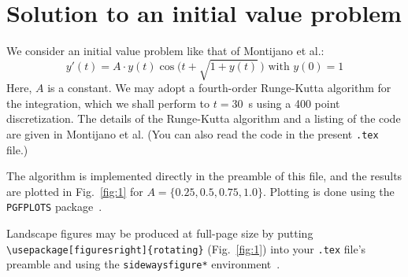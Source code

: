 \documentclass[nofontspec,grid,colorlinks,nofoot]{asmeconf}
\newcommand\addLUADEDplot[4][]{%
     \directlua{print_RKfour(#2,#3,#4,[[#1]])}%
}
\begin{document}
\section{Solution to an initial value problem}
We consider an initial value problem like that of Montijano et al.:
\begin{equation}\label{eqn:1}
y'(t) = A\cdot y(t) \cos\Big(t + \sqrt{1 + y(t)}\,\Big) \text{ with }y(0)=1
\end{equation}
Here, $A$ is a constant. We may adopt a fourth-order Runge-Kutta algorithm for the integration, which we shall perform to $t = 30$~s using a 400 point discretization.  The details of the Runge-Kutta algorithm and a listing of the code are given in Montijano et al. (You can also read the code in the present \texttt{.tex} file.)

The algorithm is implemented directly in the preamble of this file, and the results are plotted in Fig.~\ref{fig:1} for $A = \{0.25, 0.5, 0.75, 1.0\}$. Plotting is done using the \texttt{PGFPLOTS} package~\cite{pgfplots}.

Landscape figures may be produced at full-page size by putting \verb|\usepackage[figuresright]{rotating}| (Fig.~\ref{fig:1}) into your \texttt{.tex} file's preamble and using the \texttt{sidewaysfigure*} environment~\cite{fairbairns}.

\begin{sidewaysfigure*}
\caption{\MakeUppercase{A trial of pgfplot with Luacode Runge-Kutta integration}}\label{fig:1}
\end{sidewaysfigure*}
\end{document}
